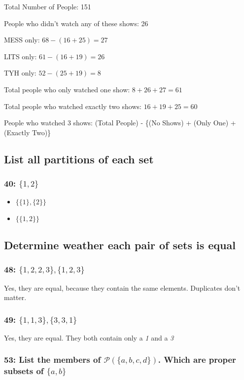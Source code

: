 \documentclass[12pt,titlepage]{article}
\begin{document}
Total Number of People: 151

People who didn't watch any of these shows: 26

MESS only: $ 68 - (16 + 25) = 27$

LITS only: $ 61- (16 + 19) = 26$

TYH only: $ 52 - (25 + 19) = 8$

Total people who only watched one show: $8 + 26 + 27 = 61$

Total people who watched exactly two shows: $16 + 19 + 25 = 60$

People who watched 3 shows: (Total People) - \{(No Shows) + (Only One) + (Exactly Two)\}

\subsection*{List all partitions of each set}
\subsubsection*{40: $\{1, 2\}$}

\begin{itemize}
	\item $\{\{1\}, \{2\}\}$
	\item $\{\{1, 2\}\}$
\end{itemize}
\subsection*{Determine weather each pair of sets is equal}
\subsubsection*{48: $\{1, 2, 2, 3\}, \{1, 2, 3\}$}

Yes, they are equal, because they contain the same elements. Duplicates don't matter.
\subsubsection*{49: $\{1, 1, 3\}, \{3, 3, 1\}$}

Yes, they are equal. They both contain only a \textit{1} and a \textit{3}
\subsubsection*{53: List the members of $\mathcal{P}(\{a, b, c, d\})$. Which are proper subsets of $\{a, b\}$}
\end{document}

